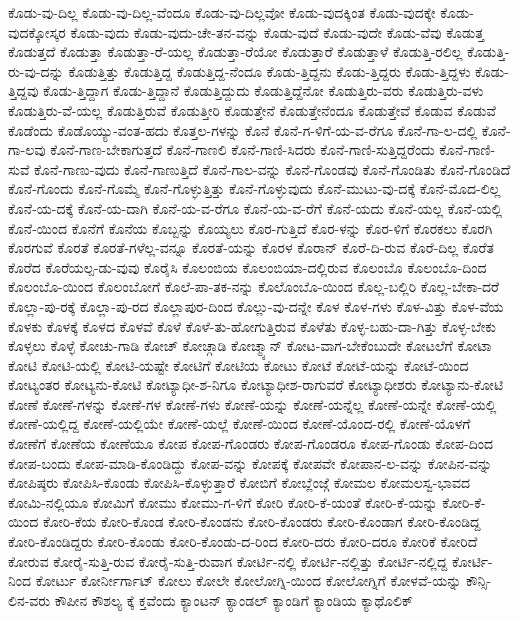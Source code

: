 {ಕೊಡು-ವು-ದಿಲ್ಲ
ಕೊಡು-ವು-ದಿಲ್ಲ-ವೆಂದೂ
ಕೊಡು-ವು-ದಿಲ್ಲವೋ
ಕೊಡು-ವುದಕ್ಕಿಂತ
ಕೊಡು-ವುದಕ್ಕೇ
ಕೊಡು-ವುದಕ್ಕೋಸ್ಕರ
ಕೊಡು-ವುದು
ಕೊಡು-ವುದು-ಚೇ-ತನ-ವನ್ನು
ಕೊಡು-ವುದೆ
ಕೊಡು-ವುದೇ
ಕೊಡು-ವೆವು
ಕೊಡುತ್ತ
ಕೊಡುತ್ತದೆ
ಕೊಡುತ್ತಾ
ಕೊಡುತ್ತಾ-ರೆ-ಯಲ್ಲ
ಕೊಡುತ್ತಾ-ರೆಯೋ
ಕೊಡುತ್ತಾರೆ
ಕೊಡುತ್ತಾಳೆ
ಕೊಡುತ್ತಿ-ರಲಿಲ್ಲ
ಕೊಡುತ್ತಿ-ರು-ವು-ದನ್ನು
ಕೊಡುತ್ತಿತ್ತು
ಕೊಡುತ್ತಿದ್ದ
ಕೊಡುತ್ತಿದ್ದ-ನೆಂದೂ
ಕೊಡು-ತ್ತಿದ್ದನು
ಕೊಡು-ತ್ತಿದ್ದರು
ಕೊಡು-ತ್ತಿದ್ದಳು
ಕೊಡು-ತ್ತಿದ್ದವು
ಕೊಡು-ತ್ತಿದ್ದಾಗ
ಕೊಡು-ತ್ತಿದ್ದಾನೆ
ಕೊಡುತ್ತಿದ್ದುದು
ಕೊಡುತ್ತಿದ್ದೆನೋ
ಕೊಡುತ್ತಿರು-ವರು
ಕೊಡುತ್ತಿರು-ವಳು
ಕೊಡುತ್ತಿರು-ವೆ-ಯಲ್ಲ
ಕೊಡುತ್ತಿರುವೆ
ಕೊಡುತ್ತೀರಿ
ಕೊಡುತ್ತೇನೆ
ಕೊಡುತ್ತೇನೆಂದೂ
ಕೊಡುತ್ತೇವೆ
ಕೊಡುವ
ಕೊಡುವೆ
ಕೊಡೆಂದು
ಕೊಡೊಯ್ಯು-ವಂತ-ಹದು
ಕೊತ್ತಲ-ಗಳನ್ನು
ಕೊನೆ
ಕೊನೆ-ಗ-ಳಿಗೆ-ಯ-ವ-ರೆಗೂ
ಕೊನೆ-ಗಾ-ಲ-ದಲ್ಲಿ
ಕೊನೆ-ಗಾ-ಲವು
ಕೊನೆ-ಗಾಣ-ಬೇಕಾಗುತ್ತದೆ
ಕೊನೆ-ಗಾಣಲಿ
ಕೊನೆ-ಗಾಣಿ-ಸಿದರು
ಕೊನೆ-ಗಾಣಿ-ಸುತ್ತಿದ್ದರೆಂದು
ಕೊನೆ-ಗಾಣಿ-ಸುವೆ
ಕೊನೆ-ಗಾಣು-ವುದು
ಕೊನೆ-ಗಾಣುತ್ತಿದೆ
ಕೊನೆ-ಗಾಲ-ವನ್ನು
ಕೊನೆ-ಗೊಂಡವು
ಕೊನೆ-ಗೊಂಡಿತು
ಕೊನೆ-ಗೊಂಡಿದೆ
ಕೊನೆ-ಗೊಂದು
ಕೊನೆ-ಗೊಮ್ಮೆ
ಕೊನೆ-ಗೊಳ್ಳುತ್ತಿತ್ತು
ಕೊನೆ-ಗೊಳ್ಳುವುದು
ಕೊನೆ-ಮುಟು-ವು-ದಕ್ಕೆ
ಕೊನೆ-ಮೊದ-ಲಿಲ್ಲ
ಕೊನೆ-ಯ-ದಕ್ಕೆ
ಕೊನೆ-ಯ-ದಾಗಿ
ಕೊನೆ-ಯ-ವ-ರೆಗೂ
ಕೊನೆ-ಯ-ವ-ರೆಗೆ
ಕೊನೆ-ಯದು
ಕೊನೆ-ಯಲ್ಲ
ಕೊನೆ-ಯಲ್ಲಿ
ಕೊನೆ-ಯಿಂದ
ಕೊನೆಗೆ
ಕೊನೆಯ
ಕೊಬ್ಬನ್ನು
ಕೊಯ್ಯಲು
ಕೊರ-ಗುತ್ತಿದೆ
ಕೊರ-ಳನ್ನು
ಕೊರ-ಳಿಗೆ
ಕೊರಕಲು
ಕೊರಗಿ
ಕೊರಗುವೆ
ಕೊರತೆ
ಕೊರತೆ-ಗಳೆಲ್ಲ-ವನ್ನೂ
ಕೊರತೆ-ಯನ್ನು
ಕೊರಳ
ಕೊರಾನ್
ಕೊರೆ-ದಿ-ರುವ
ಕೊರೆ-ದಿಲ್ಲ
ಕೊರೆತ
ಕೊರೆದ
ಕೊರೆಯಲ್ಪ-ಡು-ವುವು
ಕೊರೈಸಿ
ಕೊಲಂಬಿಯ
ಕೊಲಂಬಿಯಾ-ದಲ್ಲಿರುವ
ಕೊಲಂಬೊ
ಕೊಲಂಬೊ-ದಿಂದ
ಕೊಲಂಬೊ-ಯಿಂದ
ಕೊಲಂಬೋಗೆ
ಕೊಲೆ-ಪಾ-ತಕ-ನನ್ನು
ಕೊಲೊಂಬೊ-ಯಿಂದ
ಕೊಲ್ಲ-ಬಲ್ಲಿರಿ
ಕೊಲ್ಲ-ಬೇಕಾ-ದರೆ
ಕೊಲ್ಲಾ-ಪು-ರಕ್ಕೆ
ಕೊಲ್ಲಾ-ಪು-ರದ
ಕೊಲ್ಲಾಪುರ-ದಿಂದ
ಕೊಲ್ಲು-ವು-ದನ್ನೇ
ಕೊಳ
ಕೊಳ-ಗಳು
ಕೊಳ-ವಿತ್ತು
ಕೊಳ-ವೆಯ
ಕೊಳಕು
ಕೊಳಕ್ಕೆ
ಕೊಳದ
ಕೊಳವೆ
ಕೊಳೆ
ಕೊಳೆ-ತು-ಹೋಗುತ್ತಿರುವ
ಕೊಳೆತು
ಕೊಳ್ಳ-ಬಹು-ದಾ-ಗಿತ್ತು
ಕೊಳ್ಳ-ಬೇಕು
ಕೊಳ್ಳಲು
ಕೊಳ್ಳೆ
ಕೋಚು-ಗಾಡಿ
ಕೋಚ್
ಕೋಚ್ಗಾಡಿ
ಕೋಚ್ಮ್ಯಾನ್
ಕೋಟ-ವಾಗ-ಬೇಕೆಂಬುದೇ
ಕೋಟಲೆಗೆ
ಕೋಟಾ
ಕೋಟಿ
ಕೋಟಿ-ಯಲ್ಲಿ
ಕೋಟಿ-ಯಷ್ಟೇ
ಕೋಟಿಗೆ
ಕೋಟಿಯ
ಕೋಟು
ಕೋಟೆ
ಕೋಟೆ-ಯನ್ನು
ಕೋಟೆ-ಯಿಂದ
ಕೋಟ್ಯಂತರ
ಕೋಟ್ಯನು-ಕೋಟಿ
ಕೋಟ್ಯಾಧೀ-ಶ-ನಿಗೂ
ಕೋಟ್ಯಾಧೀಶ-ರಾಗುವರೆ
ಕೋಟ್ಯಾಧೀಶರು
ಕೋಟ್ಯಾನು-ಕೋಟಿ
ಕೋಣೆ
ಕೋಣೆ-ಗಳನ್ನು
ಕೋಣೆ-ಗಳ
ಕೋಣೆ-ಗಳು
ಕೋಣೆ-ಯನ್ನು
ಕೋಣೆ-ಯನ್ನೆಲ್ಲ
ಕೋಣೆ-ಯನ್ನೇ
ಕೋಣೆ-ಯಲ್ಲಿ
ಕೋಣೆ-ಯಲ್ಲಿದ್ದ
ಕೋಣೆ-ಯಲ್ಲಿಯೇ
ಕೋಣೆ-ಯಲ್ಲೆ
ಕೋಣೆ-ಯಿಂದ
ಕೋಣೆ-ಯೊಂದ-ರಲ್ಲಿ
ಕೋಣೆ-ಯೊಳಗೆ
ಕೋಣೆಗೆ
ಕೋಣೆಯ
ಕೋಣೆಯೂ
ಕೋಪ
ಕೋಪ-ಗೊಂಡರು
ಕೋಪ-ಗೊಂಡರೂ
ಕೋಪ-ಗೊಂಡು
ಕೋಪ-ದಿಂದ
ಕೋಪ-ಬಂದು
ಕೋಪ-ಮಾಡಿ-ಕೊಂಡಿದ್ದು
ಕೋಪ-ವನ್ನು
ಕೋಪಕ್ಕೆ
ಕೋಪವೇ
ಕೋಪಾನ-ಲ-ವನ್ನು
ಕೋಪಿನ-ವನ್ನು
ಕೋಪಿಷ್ಠರು
ಕೋಪಿಸಿ-ಕೊಂಡು
ಕೋಪಿಸಿ-ಕೊಳ್ಳುತ್ತಾರೆ
ಕೋಬಿಗೆ
ಕೋಬ್ಲೆಂಜ್ಗೆ
ಕೋಮಲ
ಕೋಮಲಸ್ವ-ಭಾವದ
ಕೋಮಿ-ನಲ್ಲಿಯೂ
ಕೋಮಿಗೆ
ಕೋಮು
ಕೋಮು-ಗ-ಳಿಗೆ
ಕೋರಿ
ಕೋರಿ-ಕೆ-ಯಂತೆ
ಕೋರಿ-ಕೆ-ಯನ್ನು
ಕೋರಿ-ಕೆ-ಯಿಂದ
ಕೋರಿ-ಕೆಯ
ಕೋರಿ-ಕೊಂಡ
ಕೋರಿ-ಕೊಂಡನು
ಕೋರಿ-ಕೊಂಡರು
ಕೋರಿ-ಕೊಂಡಾಗ
ಕೋರಿ-ಕೊಂಡಿದ್ದ
ಕೋರಿ-ಕೊಂಡಿದ್ದರು
ಕೋರಿ-ಕೊಂಡು
ಕೋರಿ-ಕೊಂಡು-ದ-ರಿಂದ
ಕೋರಿ-ದರು
ಕೋರಿ-ದರೂ
ಕೋರಿಕೆ
ಕೋರಿದೆ
ಕೋರುವ
ಕೋರೈ-ಸುತ್ತಿ-ರುವ
ಕೋರೈ-ಸುತ್ತಿ-ರುವಾಗ
ಕೋರ್ಟಿ-ನಲ್ಲಿ
ಕೋರ್ಟಿ-ನಲ್ಲಿತ್ತು
ಕೋರ್ಟಿ-ನಲ್ಲಿದ್ದ
ಕೋರ್ಟಿ-ನಿಂದ
ಕೋರ್ಟು
ಕೋರ್ನೀರ್ಗಾಟ್
ಕೋಲು
ಕೋಲೇ
ಕೋಲೋಗ್ನಿ-ಯಿಂದ
ಕೋಲೋಗ್ನಿಗೆ
ಕೋಳವೆ-ಯನ್ನು
ಕೌನ್ಸಿ-ಲಿನ-ವರು
ಕೌಪೀನ
ಕೌಶಲ್ಯ
ಕ್ಕೆ
ಕ್ತವೆಂದು
ಕ್ಯಾಂಟನ್
ಕ್ಯಾಂಡಲ್
ಕ್ಯಾಂಡಿಗೆ
ಕ್ಯಾಂಡಿಯ
ಕ್ಯಾಥೊಲಿಕ್
}
